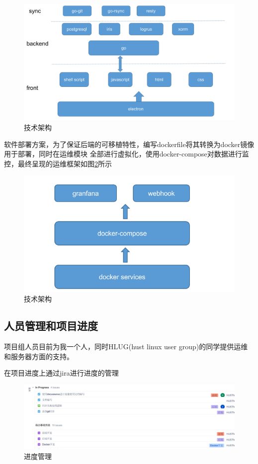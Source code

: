 \documentclass[supercite]{Experimental_Report}
\theoremstyle{definition}
\begin{document}
\begin{figure}[ht]
    \centering
    \includegraphics[scale=0.4]{./images/tech.png}
    \caption{技术架构}
	\label{tech}
\end{figure}

软件部署方案，为了保证后端的可移植特性，编写dockerfile将其转换为docker镜像用于部署，同时在运维模块
全部进行虚拟化，使用docker-compose对数据进行监控，最终呈现的运维框架如图\ref{maintain}所示

\begin{figure}[ht]
    \centering
    \includegraphics[scale=0.8]{./images/maintain.png}
    \caption{技术架构}
	\label{maintain}
\end{figure}


\subsection{人员管理和项目进度}

项目组人员目前为我一个人，同时HLUG(hust linux user group)的同学提供运维和服务器方面的支持。

在项目进度上通过jira进行进度的管理
\begin{figure}[ht]
    \centering
    \includegraphics[scale=0.4]{./images/jira.png}
    \caption{进度管理}
	\label{jira}
\end{figure}
\end{document}
